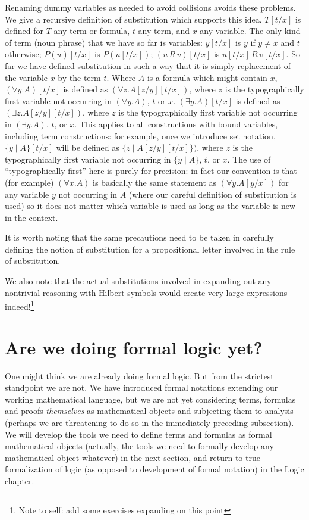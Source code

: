 \documentclass[12pt]{book}
\begin{document}
Renaming dummy variables as needed to avoid collisions avoids these
problems.  We give a recursive definition of substitution which
supports this idea.  $T[t/x]$ is defined for $T$ any term or formula,
$t$ any term, and $x$ any variable.  The only kind of term (noun
phrase) that we have so far is variables: $y[t/x]$ is $y$ if $y \neq
x$ and $t$ otherwise; $P(u)[t/x]$ is $P(u[t/x])$; $(u\,R\,v)[t/x]$ is
$u[t/x]\,R\,v[t/x]$.  So far we have defined substitution in such a
way that it is simply replacement of the variable $x$ by the term $t$.
Where $A$ is a formula which might contain $x$, $(\forall y.A)[t/x]$
is defined as $(\forall z.A[z/y][t/x])$, where $z$ is the
typographically first variable not occurring in $(\forall y.A)$, $t$
or $x$.  $(\exists y.A)[t/x]$ is defined as $(\exists z.A[z/y][t/x])$,
where $z$ is the typographically first variable not occurring in
$(\exists y.A)$, $t$, or $x$.  This applies to all constructions with
bound variables, including term constructions: for example, once we
introduce set notation, $\{y \mid A\}[t/x]$ will be defined as $\{z
\mid A[z/y][t/x]\})$, where $z$ is the typographically first variable
not occurring in $\{y \mid A\}$, $t$, or $x$.  The use of
``typographically first'' here is purely for precision: in fact our
convention is that (for example) $(\forall x.A)$ is basically the same
statement as $(\forall y.A[y/x])$ for any variable $y$ not occurring
in $A$ (where our careful definition of substitution is used) so it
does not matter which variable is used as long as the variable is new
in the context.

It is worth noting that the same precautions need to be taken in
carefully defining the notion of substitution for a propositional
letter involved in the rule of substitution.

We also note that the actual substitutions involved in expanding out any nontrivial reasoning with Hilbert symbols would create very large expressions indeed!\footnote{Note to self:  add some exercises expanding on this point}

\section{Are we doing formal logic yet?}

One might think we are already doing formal logic.  But from the
strictest standpoint we are not.  We have introduced formal notations
extending our working mathematical language, but we are not yet
considering terms, formulas and proofs {\em themselves\/} as
mathematical objects and subjecting them to analysis (perhaps we are
threatening to do so in the immediately preceding subsection).  We
will develop the tools we need to define terms and formulas as formal
mathematical objects (actually, the tools we need to formally develop
any mathematical object whatever) in the next section, and return to
true formalization of logic (as opposed to development of formal
notation) in the Logic chapter.
\end{document}
